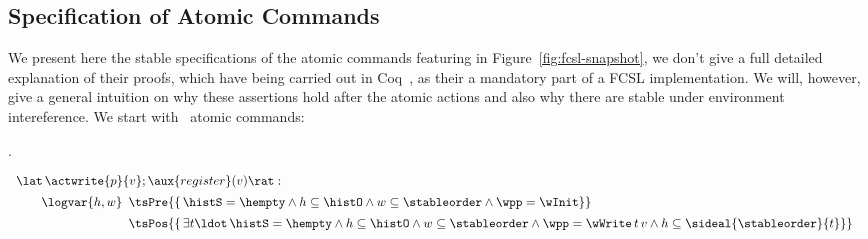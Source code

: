 \subsection{Specification of Atomic Commands}
\label{sc:atoms-pecs}

We present here the stable specifications of the atomic commands
featuring in Figure~\ref{fig:fcsl-snapshot}, we don't give a full
detailed explanation of their proofs, which have being carried out in
Coq~\cite{CoqFiles}, as their a mandatory part of a FCSL
implementation. We will, however, give a general intuition on why
these assertions hold after the atomic actions and also why there are
stable under environment intereference. We start with \jywrite~atomic
commands:

.


\[
\begin{array}{l}
\lat\,\actwrite{p}{v}; \aux{register}(v)\rat: \\[5pt]
\quad \quad \logvar{h,w}
\begin{array}[t]{l}
{\tsPre{\{\, \histS = \hempty \wedge h \subseteq \histO \wedge
             w \subseteq \stableorder \wedge \wpp = \wInit\}}} \\[5pt]
\tsPos{\{\, \exists t\ldot\, \histS = \hempty \wedge
            h \subseteq \histO \wedge
            w \subseteq \stableorder \wedge
  \wpp = \wWrite\, t\, v \wedge h \subseteq \sideal{\stableorder}{t}\}}
\end{array}
\end{array}
\]


